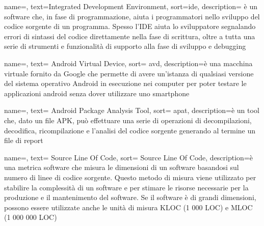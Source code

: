 
{
name=,
text=Integrated Development Environment,
sort=ide,
description={ è un software che, in fase di programmazione, aiuta i programmatori nello sviluppo del codice sorgente di un programma.
Spesso l'IDE aiuta lo sviluppatore segnalando errori di sintassi del codice direttamente nella fase di scrittura, oltre a tutta una serie di strumenti e funzionalità di supporto alla fase di sviluppo e debugging}
}


{
name=,
text= Android Virtual Device,
sort= avd,
description={è una macchina virtuale fornito da Google che permette di avere un'istanza di qualsiasi versione del sistema operativo Android in esecuzione nei computer per poter testare le applicazioni android senza dover utilizzare uno smartphone}
}


{
name=,
text= Android Package Analysis Tool,
sort= apat,
description={è un tool che, dato un file APK, può effettuare una serie di operazioni di decompilazioni, decodifica, ricompilazione e l'analisi del codice sorgente generando al termine un file di report}
}


{
name=,
text= Source Line Of Code,
sort= Source Line Of Code,
description={è una metrica software che misura le dimensioni di un software basandosi sul numero di linee di codice sorgente.
Questo metodo di misura viene utilizzato per stabilire la complessità di un software e per stimare le risorse necessarie per la produzione e il mantenimento del software.
Se il software è di grandi dimensioni, possono essere utilizzate anche le unità di misura KLOC (1 000 LOC) e MLOC (1 000 000 LOC)}
}


